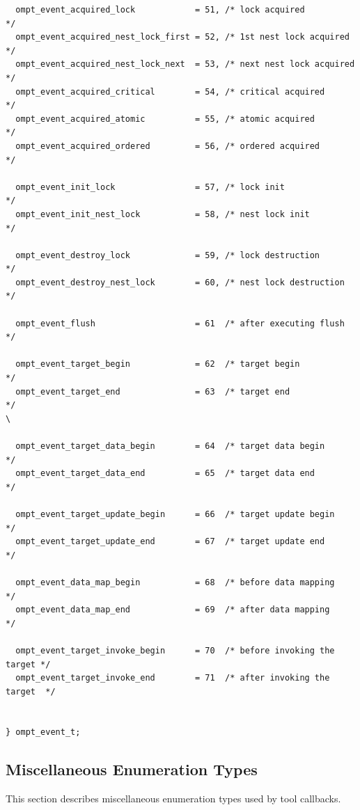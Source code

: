 \documentclass{article}
\begin{document}
{\begin{verbatim}
  ompt_event_acquired_lock            = 51, /* lock acquired              */
  ompt_event_acquired_nest_lock_first = 52, /* 1st nest lock acquired     */
  ompt_event_acquired_nest_lock_next  = 53, /* next nest lock acquired    */
  ompt_event_acquired_critical        = 54, /* critical acquired          */
  ompt_event_acquired_atomic          = 55, /* atomic acquired            */
  ompt_event_acquired_ordered         = 56, /* ordered acquired           */
			            				    	    
  ompt_event_init_lock                = 57, /* lock init                  */
  ompt_event_init_nest_lock           = 58, /* nest lock init             */
  
  ompt_event_destroy_lock             = 59, /* lock destruction           */
  ompt_event_destroy_nest_lock        = 60, /* nest lock destruction      */
			            	 			         
  ompt_event_flush                    = 61  /* after executing flush      */ 

  ompt_event_target_begin             = 62  /* target begin               */
  ompt_event_target_end               = 63  /* target end                 */                                                                                                                \

  ompt_event_target_data_begin        = 64  /* target data begin          */
  ompt_event_target_data_end          = 65  /* target data end            */

  ompt_event_target_update_begin      = 66  /* target update begin        */
  ompt_event_target_update_end        = 67  /* target update end          */

  ompt_event_data_map_begin           = 68  /* before data mapping        */
  ompt_event_data_map_end             = 69  /* after data mapping         */

  ompt_event_target_invoke_begin      = 70  /* before invoking the target */ 
  ompt_event_target_invoke_end        = 71  /* after invoking the target  */


} ompt_event_t;
\end{verbatim}

\clearpage  
\subsection{Miscellaneous Enumeration Types}
\label{appendix:ompt-types:misc}
This section describes miscellaneous enumeration types used by tool callbacks.

}
\end{document}
